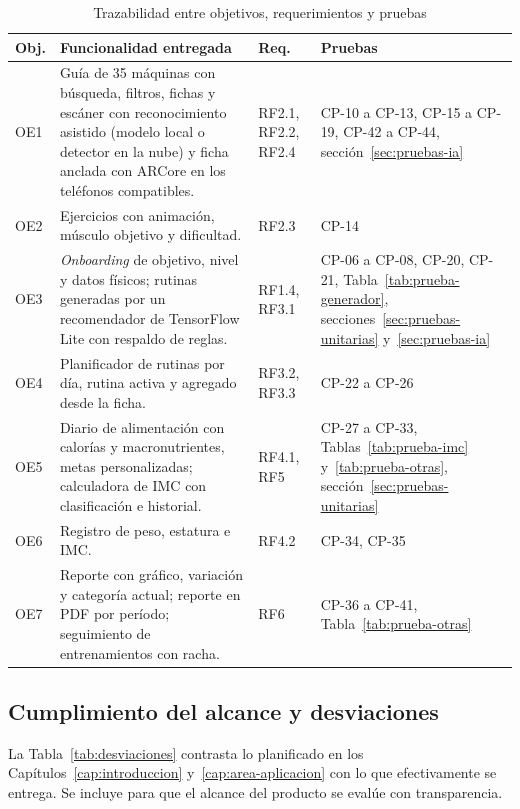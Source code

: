 \begin{table}[H]
\centering
\caption{Trazabilidad entre objetivos, requerimientos y pruebas}
\label{tab:trazabilidad}
\small
\begin{tabularx}{\textwidth}{|L{1.1cm}|Y|L{2.2cm}|L{3.4cm}|}
\hline
{} \textbf{Obj.} & \textbf{Funcionalidad entregada} & \textbf{Req.} &
\textbf{Pruebas} \\
\hline
OE1 & Guía de 35 máquinas con búsqueda, filtros, fichas y escáner con
reconocimiento asistido (modelo local o detector en la nube) y ficha anclada
con ARCore en los teléfonos compatibles. & RF2.1, RF2.2, RF2.4 &
CP-10 a CP-13, CP-15 a CP-19, CP-42 a CP-44, sección~\ref{sec:pruebas-ia} \\
\hline
OE2 & Ejercicios con animación, músculo objetivo y dificultad. & RF2.3 &
CP-14 \\ \hline
OE3 & \emph{Onboarding} de objetivo, nivel y datos físicos; rutinas
generadas por un recomendador de TensorFlow Lite con respaldo de reglas. &
RF1.4, RF3.1 & CP-06 a CP-08, CP-20, CP-21,
Tabla~\ref{tab:prueba-generador}, secciones~\ref{sec:pruebas-unitarias}
y~\ref{sec:pruebas-ia} \\ \hline
OE4 & Planificador de rutinas por día, rutina activa y agregado desde la
ficha. & RF3.2, RF3.3 & CP-22 a CP-26 \\ \hline
OE5 & Diario de alimentación con calorías y macronutrientes, metas
personalizadas; calculadora de IMC con clasificación e historial. & RF4.1, RF5 &
CP-27 a CP-33, Tablas~\ref{tab:prueba-imc} y~\ref{tab:prueba-otras},
sección~\ref{sec:pruebas-unitarias} \\ \hline
OE6 & Registro de peso, estatura e IMC. & RF4.2 & CP-34, CP-35 \\ \hline
OE7 & Reporte con gráfico, variación y categoría actual; reporte en PDF por
período; seguimiento de entrenamientos con racha. & RF6 & CP-36 a CP-41,
Tabla~\ref{tab:prueba-otras} \\
\hline
\end{tabularx}
\end{table}

\subsection{Cumplimiento del alcance y desviaciones}

La Tabla~\ref{tab:desviaciones} contrasta lo planificado en los
Capítulos~\ref{cap:introduccion} y~\ref{cap:area-aplicacion} con lo que
efectivamente se entrega. Se incluye para que el alcance del producto se
evalúe con transparencia.

